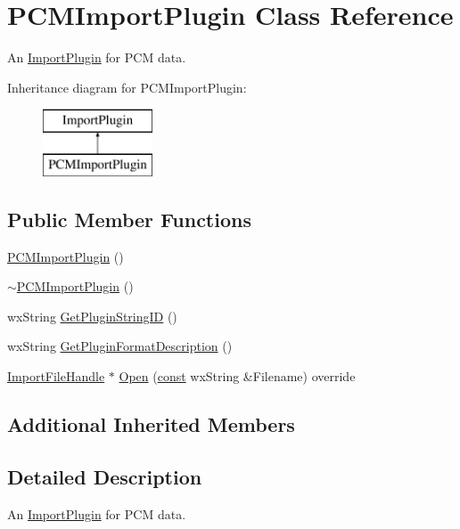 \hypertarget{class_p_c_m_import_plugin}{}\section{P\+C\+M\+Import\+Plugin Class Reference}
\label{class_p_c_m_import_plugin}


An \hyperlink{class_import_plugin}{Import\+Plugin} for P\+CM data.  


Inheritance diagram for P\+C\+M\+Import\+Plugin\+:\begin{figure}[H]
\begin{center}
\leavevmode
\includegraphics[height=2.000000cm]{class_p_c_m_import_plugin}
\end{center}
\end{figure}
\subsection*{Public Member Functions}
\begin{DoxyCompactItemize}
\item 
\hyperlink{class_p_c_m_import_plugin_ac83935b97abf69cce9f2343fe5365d14}{P\+C\+M\+Import\+Plugin} ()
\item 
\hyperlink{class_p_c_m_import_plugin_a0de63bf9eae806dfc1ac35c26ff89b69}{$\sim$\+P\+C\+M\+Import\+Plugin} ()
\item 
wx\+String \hyperlink{class_p_c_m_import_plugin_a410e9579c41f5a066f42a1b31b368f61}{Get\+Plugin\+String\+ID} ()
\item 
wx\+String \hyperlink{class_p_c_m_import_plugin_a325c02dc3252405531429b818ba7d9f8}{Get\+Plugin\+Format\+Description} ()
\item 
\hyperlink{class_import_file_handle}{Import\+File\+Handle} $\ast$ \hyperlink{class_p_c_m_import_plugin_a8ac8051cd198e66578ad82f741108986}{Open} (\hyperlink{getopt1_8c_a2c212835823e3c54a8ab6d95c652660e}{const} wx\+String \&Filename) override
\end{DoxyCompactItemize}
\subsection*{Additional Inherited Members}


\subsection{Detailed Description}
An \hyperlink{class_import_plugin}{Import\+Plugin} for P\+CM data. 

